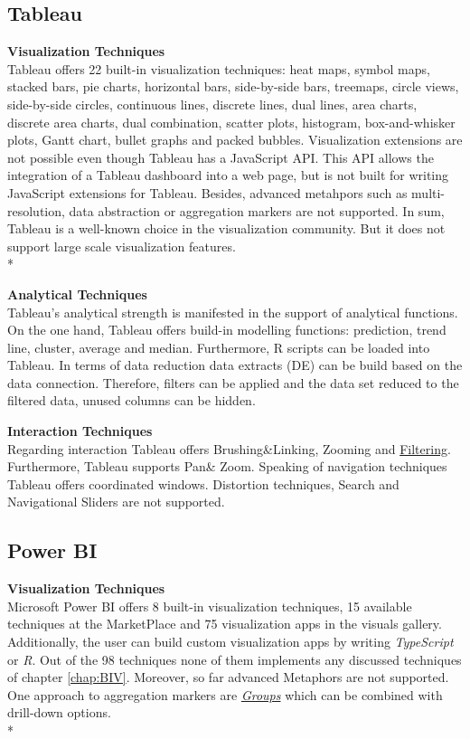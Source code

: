 \newpage
{}
\subsection*{Tableau}

\textbf{Visualization Techniques}\\
Tableau offers 22 built-in visualization techniques: heat maps, symbol maps, stacked bars, pie charts, horizontal bars, side-by-side bars, treemaps, circle views, side-by-side circles, continuous lines, discrete lines, dual lines, area charts,  discrete area charts, dual combination, scatter plots, histogram, box-and-whisker plots, Gantt chart, bullet graphs and packed bubbles.
Visualization extensions are not possible even though Tableau has a JavaScript API. This API allows the integration of a Tableau dashboard into a web page, but is not built for writing JavaScript extensions for Tableau. Besides, advanced metahpors such as multi-resolution, data abstraction or aggregation markers are not supported. 
In sum, Tableau is a well-known choice in the visualization community. But it does not support large scale visualization features. \\*

\textbf{Analytical Techniques}\\
Tableau's analytical strength is manifested in the support of analytical functions. On the one hand, Tableau offers build-in modelling functions: prediction, trend line, cluster, average and median. Furthermore, R scripts can be loaded into Tableau.  
In terms of data reduction data extracts (DE) can be build based on the data connection. Therefore, filters can be applied and the data set reduced to the filtered data, unused columns can be hidden. 

\textbf{Interaction Techniques}\\
Regarding interaction Tableau offers Brushing\&Linking, Zooming and  \hyperlink{http://kb.tableau.com/articles/howto/adding-filters-to-dashboards}{Filtering}. Furthermore, Tableau supports Pan\& Zoom. 
Speaking of navigation techniques Tableau offers coordinated windows. 
Distortion techniques, Search and Navigational Sliders are not supported. 
\newpage
\subsection*{Power BI}

\textbf{Visualization Techniques}\\
Microsoft Power BI offers 8 built-in visualization techniques, 15 available techniques at the MarketPlace and 75 visualization apps in the visuals gallery. Additionally, the user can build custom visualization apps by writing \textit{TypeScript} or \textit{R}. Out of the 98 techniques none of them implements any discussed techniques of chapter \ref{chap:BIV}. Moreover, so far advanced Metaphors are not supported\cite{Amanda}. One approach to aggregation markers are \hyperlink{https://Power BI.microsoft.com/de-de/blog/power-bi-desktop-october-feature-summary/#grouping}{\textit{Groups}} which can be combined with drill-down options.\\*

